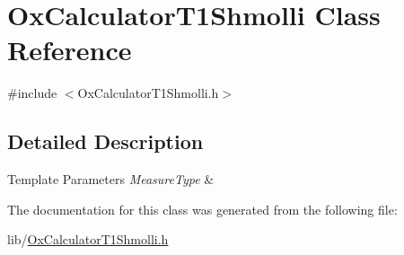 \hypertarget{class_ox_calculator_t1_shmolli}{\section{Ox\-Calculator\-T1\-Shmolli Class Reference}
\label{class_ox_calculator_t1_shmolli}
}


{\ttfamily \#include $<$Ox\-Calculator\-T1\-Shmolli.\-h$>$}



\subsection{Detailed Description}

\begin{DoxyTemplParams}{Template Parameters}
{\em Measure\-Type} & \\
\hline
\end{DoxyTemplParams}


The documentation for this class was generated from the following file\-:\begin{DoxyCompactItemize}
\item 
lib/\hyperlink{_ox_calculator_t1_shmolli_8h}{Ox\-Calculator\-T1\-Shmolli.\-h}\end{DoxyCompactItemize}

